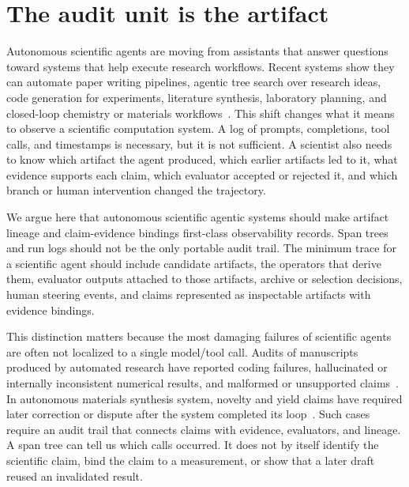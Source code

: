 \documentclass{article}
\begin{document}
\section{The audit unit is the artifact}

Autonomous scientific agents are moving from assistants that answer questions toward systems that help execute research workflows. Recent systems show they can automate paper writing pipelines, agentic tree search over research ideas, code generation for experiments, literature synthesis, laboratory planning, and closed-loop chemistry or materials workflows~\citep{lu2026endtoend,yamada2025aiscientistv2,schmidgall2025agentlab,romeraparedes2024funsearch,alphaevolve2025,boiko2023coscientist,bran2024chemcrow,swanson2025virtuallab}. This shift changes what it means to observe a scientific computation system. A log of prompts, completions, tool calls, and timestamps is necessary, but it is not sufficient. A scientist also needs to know which artifact the agent produced, which earlier artifacts led to it, what evidence supports each claim, which evaluator accepted or rejected it, and which branch or human intervention changed the trajectory.

We argue here that autonomous scientific agentic systems should make artifact lineage and claim-evidence bindings first-class observability records. Span trees and run logs should not be the only portable audit trail. The minimum trace for a scientific agent should include candidate artifacts, the operators that derive them, evaluator outputs attached to those artifacts, archive or selection decisions, human steering events, and claims represented as inspectable artifacts with evidence bindings.

This distinction matters because the most damaging failures of scientific agents are often not localized to a single model/tool call. Audits of manuscripts produced by automated research have reported coding failures, hallucinated or internally inconsistent numerical results, and malformed or unsupported claims~\citep{beel2025evaluating,xu2026ghostcite}. In autonomous materials synthesis system, novelty and yield claims have required later correction or dispute after the system completed its loop~\citep{szymanski2023autonomous,leeman2024challenges,szymanski2026correction}. Such cases require an audit trail that connects claims with evidence, evaluators, and lineage. A span tree can tell us which calls occurred. It does not by itself identify the scientific claim, bind the claim to a measurement, or show that a later draft reused an invalidated result.
\end{document}
